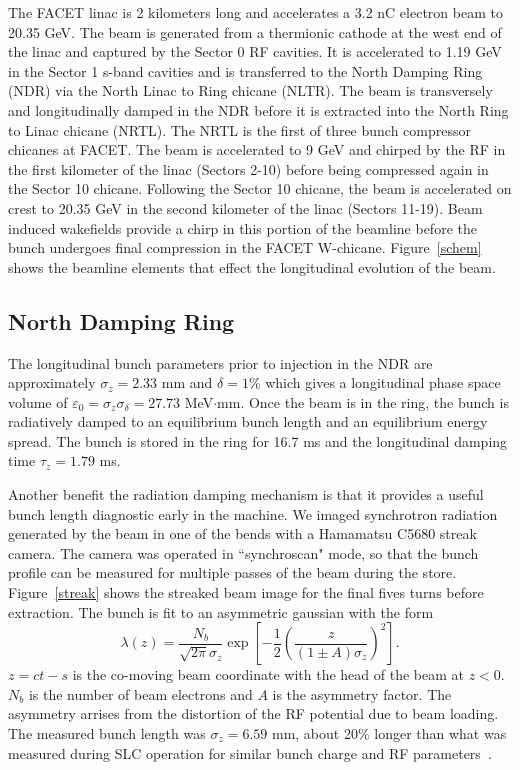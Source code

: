 \documentclass[%
twocolumn,
showpacs,preprintnumbers,
 aps,
prstab,
]{revtex4-1}
\begin{document}
The FACET linac is 2 kilometers long and accelerates a 3.2 nC electron beam to 20.35 GeV. The beam is generated from a thermionic cathode at the west end of the linac and captured by the Sector 0 RF cavities. It is accelerated to 1.19 GeV in the Sector 1 s-band cavities and is transferred to the North Damping Ring (NDR) via the North Linac to Ring chicane (NLTR). The beam is transversely and longitudinally damped in the NDR before it is extracted into the North Ring to Linac chicane (NRTL). The NRTL is the first of three bunch compressor chicanes at FACET. The beam is accelerated to 9 GeV and chirped by the RF in the first kilometer of the linac (Sectors 2-10) before being compressed again in the Sector 10 chicane. Following the Sector 10 chicane, the beam is accelerated on crest to 20.35 GeV in the second kilometer of the linac (Sectors 11-19). Beam induced wakefields provide a chirp in this portion of the beamline before the bunch undergoes final compression in the FACET W-chicane. Figure~\ref{schem} shows the beamline elements that effect the longitudinal evolution of the beam.

\subsection{North Damping Ring}\label{NDR}

The longitudinal bunch parameters prior to injection in the NDR are approximately $\sigma_z = 2.33$ mm and $\delta = 1$\% which gives a longitudinal phase space volume of $\varepsilon_{0} = \sigma_z \sigma_{\delta} = 27.73$ MeV$\cdot$mm. Once the beam is in the ring, the bunch is radiatively damped to an equilibrium bunch length and an equilibrium energy spread. The bunch is stored in the ring for 16.7 ms and the longitudinal damping time $\tau_z = 1.79$ ms. 

Another benefit the radiation damping mechanism is that it provides a useful bunch length diagnostic early in the machine. We imaged synchrotron radiation generated by the beam in one of the bends with a Hamamatsu C5680 streak camera. The camera was operated in ``synchroscan" mode, so that the bunch profile can be measured for multiple passes of the beam during the store. Figure~\ref{streak} shows the streaked beam image for the final fives turns before extraction.  The bunch is fit to an asymmetric gaussian with the form
\begin{equation}
 \lambda(z) = \frac{N_b}{\sqrt{2\pi}\sigma_z}\exp{ \left[-\frac{1}{2}\left(\frac{z}{(1\pm A)\sigma_z}\right)^2\right]}.
\end{equation}
$z = ct-s$ is the co-moving beam coordinate with the head of the beam at $z < 0$. $N_b$ is the number of beam electrons and $A$ is the asymmetry factor.  The asymmetry arrises from the distortion of the RF potential due to beam loading. The measured bunch length was $\sigma_z = 6.59$ mm, about 20\% longer than what was measured during SLC operation for similar bunch charge and RF parameters~\cite{Holtzapple}.
\end{document}
